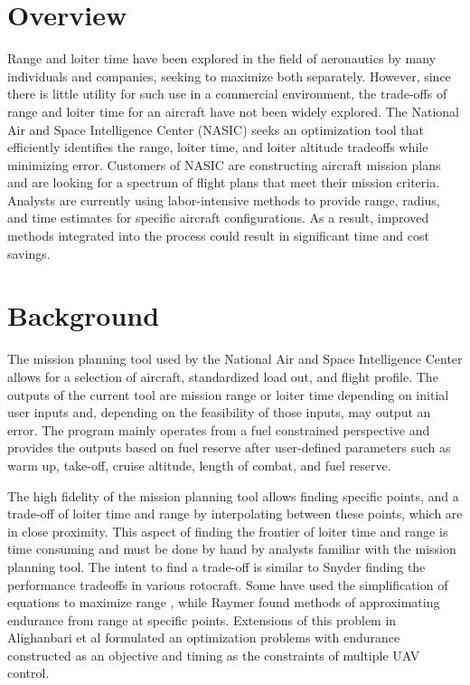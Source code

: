 \section{Overview}
\hspace{.5cm} Range and loiter time have been explored in the field of aeronautics by many individuals and companies, seeking to maximize both separately. However, since there is little utility for such use in a commercial environment, the trade-offs of range and loiter time for an aircraft have not been widely explored. The National Air and Space Intelligence Center (NASIC) seeks an optimization tool that efficiently identifies the range, loiter time, and loiter altitude tradeoffs while minimizing error. Customers of NASIC are constructing aircraft mission plans and are looking for a spectrum of flight plans that meet their mission criteria. Analysts are currently using labor-intensive methods to provide range, radius, and time estimates for specific aircraft configurations. As a result, improved methods integrated into the process could result in significant time and cost savings. 

\section{Background}

\hspace{.5cm}The mission planning tool used by the National Air and Space Intelligence Center allows for a selection of aircraft, standardized load out, and flight profile. The outputs of the current tool are mission range or loiter time depending on initial user inputs and, depending on the feasibility of those inputs, may output an error. The program mainly operates from a fuel constrained perspective and provides the outputs based on fuel reserve after user-defined parameters such as warm up, take-off, cruise altitude, length of combat, and fuel reserve. \par
The high fidelity of the mission planning tool allows finding specific points, and a trade-off of loiter time and range by interpolating between these points, which are in close proximity. This aspect of finding the frontier of loiter time and range is time consuming and must be done by hand by analysts familiar with the mission planning tool. The intent to find a trade-off is similar to Snyder \cite{Tradeoffs} finding the performance tradeoffs in various rotocraft. Some have used the simplification of equations to maximize range \cite{breguetRangeEqn, OptimizeBreguet}, while Raymer \cite{LoiterTimeFromRange} found methods of approximating endurance from range at specific points. Extensions of this problem in Alighanbari et al \cite{Alighanbari} formulated an optimization problems with endurance constructed as an objective and timing as the constraints of multiple UAV control. 

